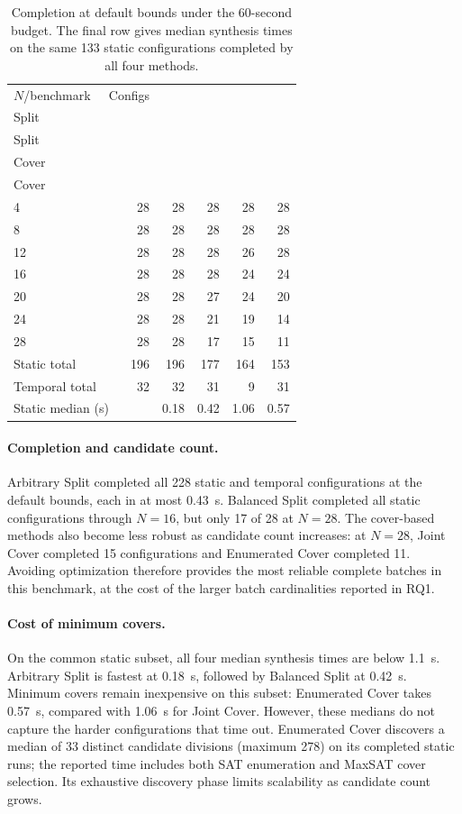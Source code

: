 \documentclass[runningheads]{llncs}
\newcommand{\methodname}[1]{\textup{\textsf{#1}}}
\newcommand{\arbitrarysplit}{\methodname{Arbitrary Split}}
\newcommand{\balancedsplit}{\methodname{Balanced Split}}
\newcommand{\jointcover}{\methodname{Joint Cover}}
\newcommand{\enumeratedcover}{\methodname{Enumerated Cover}}
\newcommand{\methodheading}[2]{\shortstack{\methodname{#1}\\\methodname{#2}}}
\begin{document}
\begin{table}[t]
\centering
\caption{Completion at default bounds under the 60-second budget. The final
row gives median synthesis times on the same 133 static configurations
completed by all four methods.}
\label{tab:synthesis-cost}
\small
\setlength{\tabcolsep}{5pt}
\begin{tabular}{lrrrrr}
\toprule
$N$/benchmark & Configs & \methodheading{Arbitrary}{Split} &
    \methodheading{Balanced}{Split} & \methodheading{Joint}{Cover} &
    \methodheading{Enumerated}{Cover} \\
\midrule
4  & 28 & 28 & 28 & 28 & 28 \\
8  & 28 & 28 & 28 & 28 & 28 \\
12 & 28 & 28 & 28 & 26 & 28 \\
16 & 28 & 28 & 28 & 24 & 24 \\
20 & 28 & 28 & 27 & 24 & 20 \\
24 & 28 & 28 & 21 & 19 & 14 \\
28 & 28 & 28 & 17 & 15 & 11 \\
\midrule
Static total & 196 & 196 & 177 & 164 & 153 \\
Temporal total & 32 & 32 & 31 & 9 & 31 \\
\midrule
\multicolumn{2}{l}{Static median (s)} & 0.18 & 0.42 & 1.06 & 0.57 \\
\bottomrule
\end{tabular}
\end{table}

\paragraph{Completion and candidate count.}
\arbitrarysplit{} completed all 228 static and temporal configurations at
the default bounds, each in at most 0.43~s. \balancedsplit{} completed all
static configurations through $N=16$, but only 17 of 28 at $N=28$. The
cover-based methods also become less robust as candidate count increases:
at $N=28$, \jointcover{} completed 15 configurations and
\enumeratedcover{} completed 11. Avoiding optimization therefore provides
the most reliable complete batches in this benchmark, at the cost of the
larger batch cardinalities reported in RQ1.

\paragraph{Cost of minimum covers.}
On the common static subset, all four median synthesis times are below
1.1~s. \arbitrarysplit{} is fastest at 0.18~s, followed by
\balancedsplit{} at 0.42~s. Minimum covers remain inexpensive on this subset:
\enumeratedcover{} takes 0.57~s, compared with 1.06~s for \jointcover{}.
However, these medians do not capture the harder configurations that time
out. \enumeratedcover{} discovers a median of 33 distinct candidate
divisions (maximum 278) on its completed static runs; the reported time
includes both SAT enumeration and MaxSAT cover selection. Its exhaustive
discovery phase limits scalability as candidate count grows.
\end{document}
